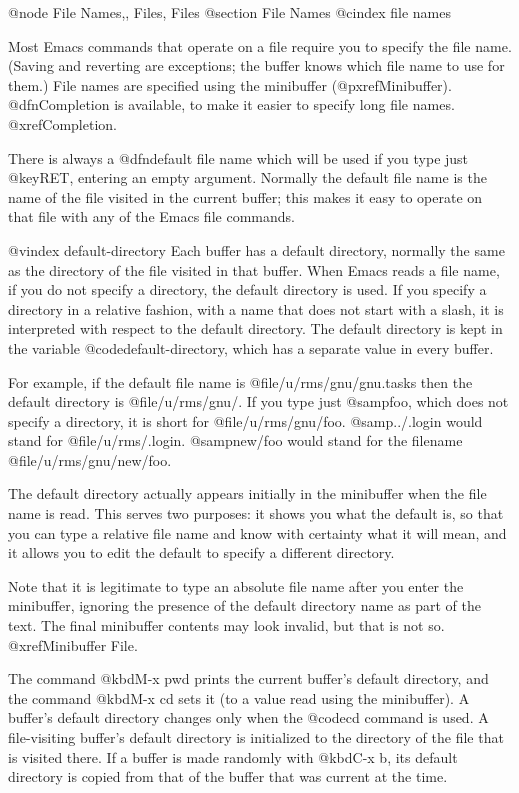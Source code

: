 {{{{{{{{{{{{{{{{{{{@node File Names,, Files, Files
@section File Names
@cindex file names

  Most Emacs commands that operate on a file require you to specify the
file name.  (Saving and reverting are exceptions; the buffer knows which
file name to use for them.)  File names are specified using the minibuffer
(@pxref{Minibuffer}).  @dfn{Completion} is available, to make it easier to
specify long file names.  @xref{Completion}.

  There is always a @dfn{default file name} which will be used if you type
just @key{RET}, entering an empty argument.  Normally the default file name
is the name of the file visited in the current buffer; this makes it easy
to operate on that file with any of the Emacs file commands.

@vindex default-directory
  Each buffer has a default directory, normally the same as the directory
of the file visited in that buffer.  When Emacs reads a file name, if you
do not specify a directory, the default directory is used.  If you specify
a directory in a relative fashion, with a name that does not start with a
slash, it is interpreted with respect to the default directory.  The
default directory is kept in the variable @code{default-directory}, which
has a separate value in every buffer.

  For example, if the default file name is @file{/u/rms/gnu/gnu.tasks} then
the default directory is @file{/u/rms/gnu/}.  If you type just @samp{foo},
which does not specify a directory, it is short for @file{/u/rms/gnu/foo}.
@samp{../.login} would stand for @file{/u/rms/.login}.  @samp{new/foo}
would stand for the filename @file{/u/rms/gnu/new/foo}.

  The default directory actually appears initially in the minibuffer when
the file name is read.  This serves two purposes: it shows you what the
default is, so that you can type a relative file name and know with
certainty what it will mean, and it allows you to edit the default to
specify a different directory.

  Note that it is legitimate to type an absolute file name after you enter
the minibuffer, ignoring the presence of the default directory name as part
of the text.  The final minibuffer contents may look invalid, but that is
not so.  @xref{Minibuffer File}.

  The command @kbd{M-x pwd} prints the current buffer's default directory,
and the command @kbd{M-x cd} sets it (to a value read using the
minibuffer).  A buffer's default directory changes only when the @code{cd}
command is used.  A file-visiting buffer's default directory is initialized
to the directory of the file that is visited there.  If a buffer is made
randomly with @kbd{C-x b}, its default directory is copied from that of the
buffer that was current at the time.

}}}}}}}}}}}}}}}}}}}
